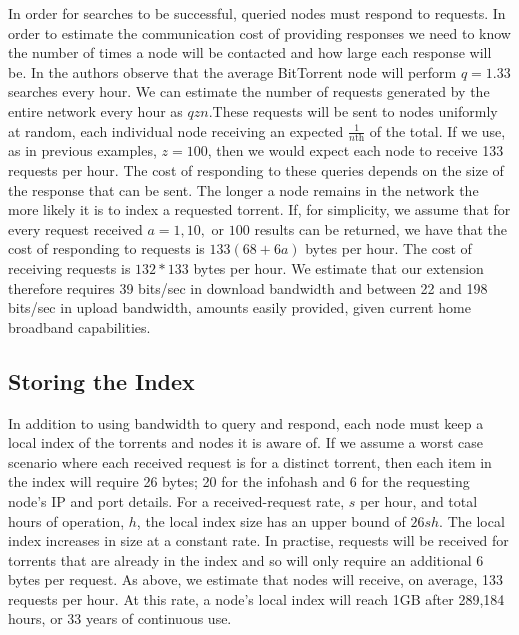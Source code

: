    In order for searches to be successful, queried nodes must respond to requests. In order to estimate the communication cost of providing responses we need to know the number of times a node will be contacted and how large each response will be. In \cite{guo_measurements_2005} the authors observe that the average BitTorrent node will perform $q=1.33$ searches every hour. We can estimate the number of requests generated by the entire network every hour as $qzn$.These requests will be sent to nodes uniformly at random, each individual node receiving an expected $\tfrac{1}{n\text{th}}$ of the total. If we use, as in previous examples, $z=100$, then we would expect each node to receive 133 requests per hour. The cost of responding to these queries depends on the size of the response that can be sent. The longer a node remains in the network the more likely it is to index a requested torrent. If, for simplicity, we assume that for every request received $a=1,10,\textrm{ or }100$ results can be returned, we have that the cost of responding to requests is $133(68 + 6a)$ bytes per hour. The cost of receiving requests is $132*133$ bytes per hour. We estimate that our extension therefore requires 39 bits/sec in download bandwidth and between 22 and 198 bits/sec in upload bandwidth, amounts easily provided, given current home broadband capabilities.

\subsection{Storing the Index}

    In addition to using bandwidth to query and respond, each node must keep a local index of the torrents and nodes it is aware of. If we assume a worst case scenario where each received request is for a distinct torrent, then each item in the index will require 26 bytes; 20 for the infohash and 6 for the requesting node's IP and port details. For a received-request rate, $s$ per hour, and total hours of operation, $h$, the local index size has an upper bound of $26sh$. The local index increases in size at a constant rate. In practise, requests will be received for torrents that are already in the index and so will only require an additional 6 bytes per request. As above, we estimate that nodes will receive, on average, 133 requests per hour. At this rate, a node's local index will reach 1GB after 289,184 hours, or 33 years of continuous use.

